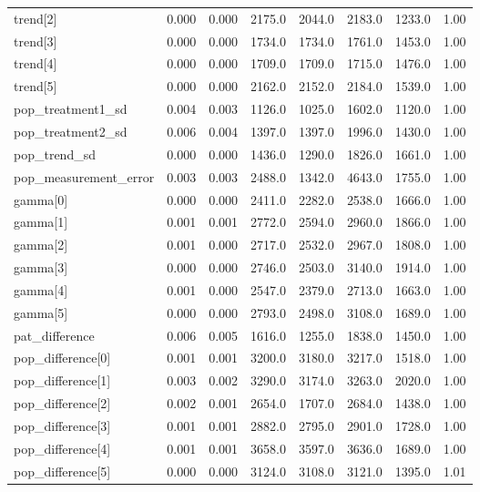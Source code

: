 \begin{tabular}{lrrrrrrr}
trend[2]              &      0.000 &    0.000 &    2175.0 &  2044.0 &    2183.0 &    1233.0 &   1.00 \\
trend[3]              &      0.000 &    0.000 &    1734.0 &  1734.0 &    1761.0 &    1453.0 &   1.00 \\
trend[4]              &      0.000 &    0.000 &    1709.0 &  1709.0 &    1715.0 &    1476.0 &   1.00 \\
trend[5]              &      0.000 &    0.000 &    2162.0 &  2152.0 &    2184.0 &    1539.0 &   1.00 \\
pop\_treatment1\_sd     &      0.004 &    0.003 &    1126.0 &  1025.0 &    1602.0 &    1120.0 &   1.00 \\
pop\_treatment2\_sd     &      0.006 &    0.004 &    1397.0 &  1397.0 &    1996.0 &    1430.0 &   1.00 \\
pop\_trend\_sd          &      0.000 &    0.000 &    1436.0 &  1290.0 &    1826.0 &    1661.0 &   1.00 \\
pop\_measurement\_error &      0.003 &    0.003 &    2488.0 &  1342.0 &    4643.0 &    1755.0 &   1.00 \\
gamma[0]              &      0.000 &    0.000 &    2411.0 &  2282.0 &    2538.0 &    1666.0 &   1.00 \\
gamma[1]              &      0.001 &    0.001 &    2772.0 &  2594.0 &    2960.0 &    1866.0 &   1.00 \\
gamma[2]              &      0.001 &    0.000 &    2717.0 &  2532.0 &    2967.0 &    1808.0 &   1.00 \\
gamma[3]              &      0.000 &    0.000 &    2746.0 &  2503.0 &    3140.0 &    1914.0 &   1.00 \\
gamma[4]              &      0.001 &    0.000 &    2547.0 &  2379.0 &    2713.0 &    1663.0 &   1.00 \\
gamma[5]              &      0.000 &    0.000 &    2793.0 &  2498.0 &    3108.0 &    1689.0 &   1.00 \\
pat\_difference        &      0.006 &    0.005 &    1616.0 &  1255.0 &    1838.0 &    1450.0 &   1.00 \\
pop\_difference[0]     &      0.001 &    0.001 &    3200.0 &  3180.0 &    3217.0 &    1518.0 &   1.00 \\
pop\_difference[1]     &      0.003 &    0.002 &    3290.0 &  3174.0 &    3263.0 &    2020.0 &   1.00 \\
pop\_difference[2]     &      0.002 &    0.001 &    2654.0 &  1707.0 &    2684.0 &    1438.0 &   1.00 \\
pop\_difference[3]     &      0.001 &    0.001 &    2882.0 &  2795.0 &    2901.0 &    1728.0 &   1.00 \\
pop\_difference[4]     &      0.001 &    0.001 &    3658.0 &  3597.0 &    3636.0 &    1689.0 &   1.00 \\
pop\_difference[5]     &      0.000 &    0.000 &    3124.0 &  3108.0 &    3121.0 &    1395.0 &   1.01 \\
\bottomrule
\end{tabular}
